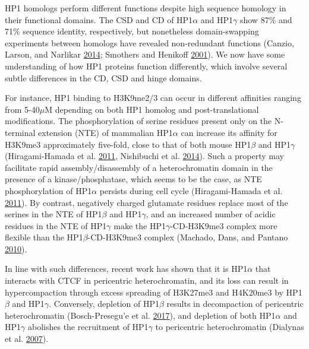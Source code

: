 \documentclass[onehalf,12pt]{beavtex}
\begin{document}
  HP1 homologs perform different functions despite high sequence homology
  in their functional domains. The CSD and CD of HP1\(\alpha\) and
  HP1\(\gamma\) show 87\% and 71\% sequence identity, respectively, but
  nonetheless domain-swapping experiments between homologs have revealed
  non-redundant functions (Canzio, Larson, and Narlikar
  \protect\hyperlink{ref-CanzioMechanismsfunctionalpromiscuity2014}{2014};
  Smothers and Henikoff
  \protect\hyperlink{ref-SmothersHingeChromoShadow2001}{2001}). We now
  have some understanding of how HP1 proteins function differently, which
  involve several subtle differences in the CD, CSD and hinge domains.
  
  For instance, HP1 binding to H3K9me2/3 can occur in different affinities
  ranging from 5-40\(\mu\)M depending on both HP1 homolog and
  post-translational modifications. The phosphorylation of serine residues
  present only on the N-terminal extension (NTE) of mammalian
  HP1\(\alpha\) can increase its affinity for H3K9me3 approximately
  five-fold, close to that of both mouse HP1\(\beta\) and HP1\(\gamma\)
  (Hiragami-Hamada et al.
  \protect\hyperlink{ref-Hiragami-HamadaNTerminalPhosphorylationHP12011}{2011},
  Nishibuchi et al.
  \protect\hyperlink{ref-NishibuchiNterminalphosphorylationHP1a2014}{2014}).
  Such a property may facilitate rapid assembly/disassembly of a
  heterochromatin domain in the presence of a kinase/phosphatase, which
  seems to be the case, as NTE phosphorylation of HP1\(\alpha\) persists
  during cell cycle (Hiragami-Hamada et al.
  \protect\hyperlink{ref-Hiragami-HamadaNTerminalPhosphorylationHP12011}{2011}).
  By contrast, negatively charged glutamate residues replace most of the
  serines in the NTE of HP1\(\beta\) and HP1\(\gamma\), and an increased
  number of acidic residues in the NTE of HP1\(\gamma\) make the
  HP1\(\gamma\)-CD-H3K9me3 complex more flexible than the
  HP1\(\beta\)-CD-H3K9me3 complex (Machado, Dans, and Pantano
  \protect\hyperlink{ref-MachadoIsoformspecificdeterminantsHP12010}{2010}).
  
  In line with such differences, recent work has shown that it is
  HP1\(\alpha\) that interacts with CTCF in pericentric heterochromatin,
  and its loss can result in hypercompaction through excess spreading of
  H3K27me3 and H4K20me3 by HP1\(\beta\) and HP1\(\gamma\). Conversely,
  depletion of HP1\(\beta\) results in decompaction of pericentric
  heterochromatin (Bosch-Presegu\a'e et al.
  \protect\hyperlink{ref-Bosch-PresegueMammalianHP1Isoforms2017}{2017}),
  and depletion of both HP1\(\alpha\) and HP1\(\gamma\) abolishes the
  recruitment of HP1\(\gamma\) to pericentric heterochromatin (Dialynas et
  al. \protect\hyperlink{ref-DialynasPlasticityHP1proteins2007}{2007}).
  
\end{document}
